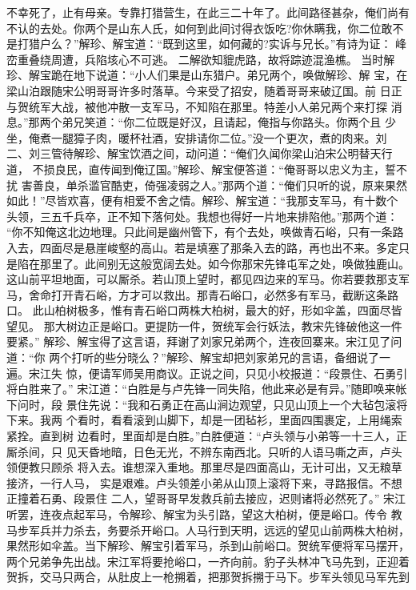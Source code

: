 不幸死了，止有母亲。专靠打猎营生，在此三二十年了。此间路径甚杂，俺们尚有
不认的去处。你两个是山东人氏，如何到此间讨得衣饭吃?你休瞒我，你二位敢不
是打猎户么？”解珍、解宝道：“既到这里，如何藏的?实诉与兄长。”有诗为证：
峰峦重叠绕周遭，兵陷垓心不可逃。
二解欲知貔虎路，故将踪迹混渔樵。
当时解珍、解宝跪在地下说道：“小人们果是山东猎户。弟兄两个，唤做解珍、解
宝，在梁山泊跟随宋公明哥哥许多时落草。今来受了招安，随着哥哥来破辽国。前
日正与贺统军大战，被他冲散一支军马，不知陷在那里。特差小人弟兄两个来打探
消息。”那两个弟兄笑道：“你二位既是好汉，且请起，俺指与你路头。你两个且
少坐，俺煮一腿獐子肉，暖杯社酒，安排请你二位。”没一个更次，煮的肉来。刘
二、刘三管待解珍、解宝饮酒之间，动问道：“俺们久闻你梁山泊宋公明替天行道，
不损良民，直传闻到俺辽国。”解珍、解宝便答道：“俺哥哥以忠义为主，誓不扰
害善良，单杀滥官酷吏，倚强凌弱之人。”那两个道：“俺们只听的说，原来果然
如此！”尽皆欢喜，便有相爱不舍之情。解珍、解宝道：“我那支军马，有十数个
头领，三五千兵卒，正不知下落何处。我想也得好一片地来排陷他。”那两个道：
“你不知俺这北边地理。只此间是幽州管下，有个去处，唤做青石峪，只有一条路
入去，四面尽是悬崖峻壑的高山。若是填塞了那条入去的路，再也出不来。多定只
是陷在那里了。此间别无这般宽阔去处。如今你那宋先锋屯军之处，唤做独鹿山。
这山前平坦地面，可以厮杀。若山顶上望时，都见四边来的军马。你若要救那支军
马，舍命打开青石峪，方才可以救出。那青石峪口，必然多有军马，截断这条路口。
此山柏树极多，惟有青石峪口两株大柏树，最大的好，形如伞盖，四面尽皆望见。
那大树边正是峪口。更提防一件，贺统军会行妖法，教宋先锋破他这一件要紧。”
解珍、解宝得了这言语，拜谢了刘家兄弟两个，连夜回寨来。宋江见了问道：“你
两个打听的些分晓么？”解珍、解宝却把刘家弟兄的言语，备细说了一遍。宋江失
惊，便请军师吴用商议。正说之间，只见小校报道：“段景住、石勇引将白胜来了。”
宋江道：“白胜是与卢先锋一同失陷，他此来必是有异。”随即唤来帐下问时，段
景住先说：“我和石勇正在高山涧边观望，只见山顶上一个大毡包滚将下来。我两
个看时，看看滚到山脚下，却是一团毡衫，里面四围裹定，上用绳索紧拴。直到树
边看时，里面却是白胜。”白胜便道：“卢头领与小弟等一十三人，正厮杀间，只
见天昏地暗，日色无光，不辨东南西北。只听的人语马嘶之声，卢头领便教只顾杀
将入去。谁想深入重地。那里尽是四面高山，无计可出，又无粮草接济，一行人马，
实是艰难。卢头领差小弟从山顶上滚将下来，寻路报信。不想正撞着石勇、段景住
二人，望哥哥早发救兵前去接应，迟则诸将必然死了。”
宋江听罢，连夜点起军马，令解珍、解宝为头引路，望这大柏树，便是峪口。传令
教马步军兵并力杀去，务要杀开峪口。人马行到天明，远远的望见山前两株大柏树，
果然形如伞盖。当下解珍、解宝引着军马，杀到山前峪口。贺统军便将军马摆开，
两个兄弟争先出战。宋江军将要抢峪口，一齐向前。豹子头林冲飞马先到，正迎着
贺拆，交马只两合，从肚皮上一枪搠着，把那贺拆搠于马下。步军头领见马军先到
